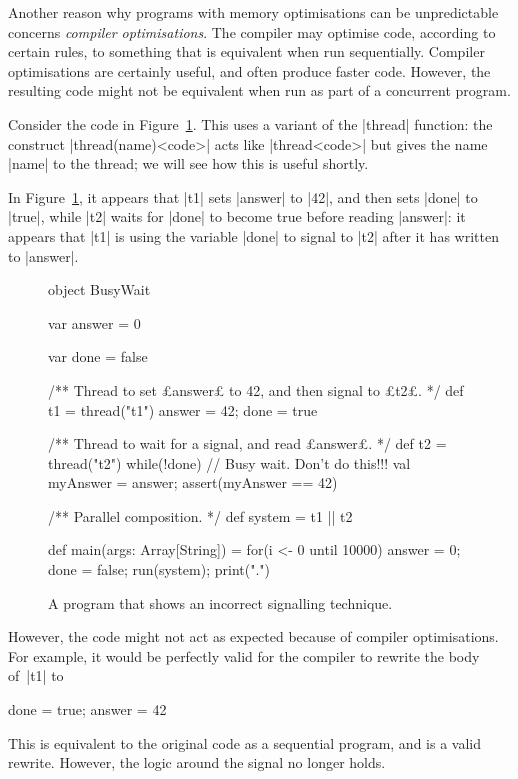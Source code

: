 
Another reason why programs with memory optimisations can be unpredictable
concerns \emph{compiler optimisations}.  The
compiler may optimise code, according to certain rules, to something that is
equivalent when run sequentially.  Compiler optimisations are certainly
useful, and often produce faster code.  However, the resulting code might not
be equivalent when run as part of a concurrent program.

Consider the code in Figure~\ref{fig:busyWait}.  This uses a variant of the
|thread| function: the construct |thread(name){<code>}| acts
like |thread{<code>}| but gives the name |name| to the thread; we will see how
this is useful shortly.

In Figure~\ref{fig:busyWait}, it appears that |t1| sets |answer| to |42|, and
then sets |done| to |true|, while |t2| waits for |done| to become true before
reading |answer|: it appears that |t1| is using the variable |done| to signal
to |t2| after it has written to |answer|.

\begin{figure}
\begin{scala}
object BusyWait{
  var answer = 0

  var done = false

  /** Thread to set £answer£ to 42, and then signal to £t2£. */
  def t1 = thread("t1"){ answer = 42; done = true }

  /** Thread to wait for a signal, and read £answer£. */
  def t2 = thread("t2"){
    while(!done){ } // Busy wait.  Don't do this!!!
    val myAnswer = answer; assert(myAnswer == 42)
  }

  /** Parallel composition. */
  def system = t1 || t2

  def main(args: Array[String]) = { 
    for(i <- 0 until 10000){ answer = 0; done = false; run(system); print(".") }
  }
}
\end{scala}
\caption{A program that shows an incorrect signalling technique.}
\label{fig:busyWait}
\end{figure}

However, the code might not act as expected because of compiler
optimisations.  For example, it would be perfectly valid for the compiler to
rewrite the body of~|t1| to
\begin{scala}
  done = true; answer = 42
\end{scala}
%
This is equivalent to the original code as a sequential program, and is a
valid rewrite.  However, the logic around the signal no longer holds.

